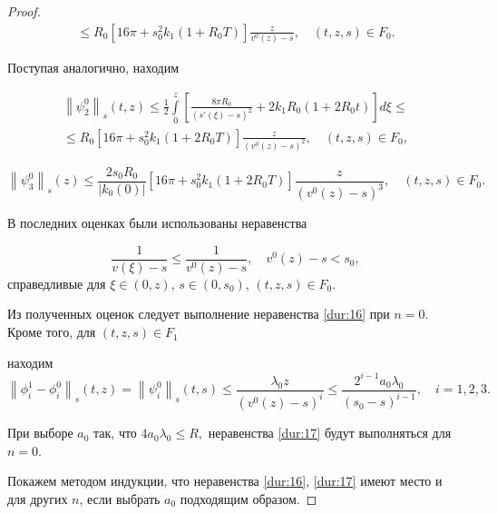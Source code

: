 \begin{proof}
\begin{multline*}
\leqslant {R_0}\left[ {16\pi  + s_0^2{k_1}(1 + {R_0}T)} \right]\frac{z}{{{v^0}(z) - s}} ,\quad  (t, z, s)  \in {F_0}.

\end{multline*}

Поступая аналогично, находим

\begin{multline*}

{\left\| {\psi _2^0} \right\|_s}(t,z) \leqslant \frac 12 \int\limits_0^z   \left[ {\frac{{8\pi {R_0}}}{{{{(s'(\xi ) - s)}^2}}} + 2{k_1}{R_0}

(1 + 2{R_0}t)} \right]d\xi  \leqslant 

\\

\leqslant{R_0}\left[ {16\pi  + s_0^2{k_1}(1 + 2{R_0}T)} \right]\frac{z}{{{{({v^0}(z) - s)}^2}}},\quad 

   (t, z, s)  \in {F_0},

\end{multline*}

\[{\left\| {\psi _3^0} \right\|_s}(z) \leqslant  \frac{{2{s_0}{R_0}}}{{\left| {{k_0}(0)} \right|}}\left[ {16\pi  + s_0^2{k_1}(1 + 2{R_0}T)}

\right]\frac{z}{{{{({v^0}(z) - s)}^3}}},\quad  (t, z, s)  \in {F_0}.\]





В последних оценках были использованы неравенства  

$$\frac{1}{{v\left( \xi  \right) - s}} \leqslant \frac{1}{{{v^0}(z) - s}},\quad 

{v^0}(z) - s < {s_0},$$ справедливые для  $\xi  \in (0,z)$, $s \in (0,{s_0})$,  $(t, z, s)  \in {F_0}$.

Из полученных оценок следует выполнение неравенства \eqref{dur:16} при $n = 0$. Кроме того, для  $(t, z, s)  \in {F_1}$

находим \[{\left\| {\phi _i^1 - \phi _i^0} \right\|_s}(t,z) = {\left\| {\psi _i^0} \right\|_s}(t,s) \leqslant \frac{{{\lambda _0}z}}

{{{{\left( {{v^0}(z) - s} \right)}^i}}} \leqslant \frac{{{2^{i - 1}}{a_0}

{\lambda _0}}}{{{{\left( {{s_0} - s} \right)}^{i - 1}}}}, \quad  i=1, 2, 3.\]

При выборе $a_0$ так, что $4{a_0}{\lambda _0} \leqslant R,$ неравенства \eqref{dur:17} будут выполняться для $n = 0$.

Покажем методом индукции, что неравенства \eqref{dur:16}, \eqref{dur:17} имеют место и для других  $n$, если выбрать $a_0$ подходящим образом. 


\end{proof}
